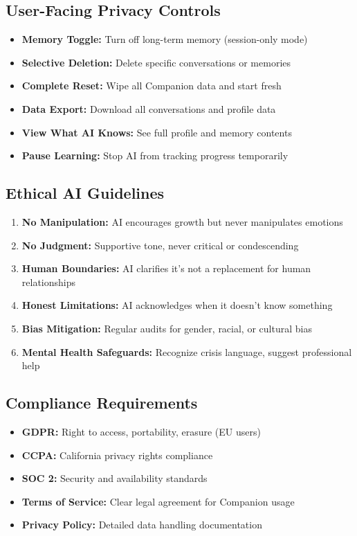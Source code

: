 \documentclass[12pt,a4paper]{article}
\begin{document}
\subsection{User-Facing Privacy Controls}

\begin{itemize}
    \item \textbf{Memory Toggle:} Turn off long-term memory (session-only mode)
    \item \textbf{Selective Deletion:} Delete specific conversations or memories
    \item \textbf{Complete Reset:} Wipe all Companion data and start fresh
    \item \textbf{Data Export:} Download all conversations and profile data
    \item \textbf{View What AI Knows:} See full profile and memory contents
    \item \textbf{Pause Learning:} Stop AI from tracking progress temporarily
\end{itemize}

\subsection{Ethical AI Guidelines}

\begin{enumerate}[leftmargin=*]
    \item \textbf{No Manipulation:} AI encourages growth but never manipulates emotions
    \item \textbf{No Judgment:} Supportive tone, never critical or condescending
    \item \textbf{Human Boundaries:} AI clarifies it's not a replacement for human relationships
    \item \textbf{Honest Limitations:} AI acknowledges when it doesn't know something
    \item \textbf{Bias Mitigation:} Regular audits for gender, racial, or cultural bias
    \item \textbf{Mental Health Safeguards:} Recognize crisis language, suggest professional help
\end{enumerate}

\subsection{Compliance Requirements}

\begin{itemize}
    \item \textbf{GDPR:} Right to access, portability, erasure (EU users)
    \item \textbf{CCPA:} California privacy rights compliance
    \item \textbf{SOC 2:} Security and availability standards
    \item \textbf{Terms of Service:} Clear legal agreement for Companion usage
    \item \textbf{Privacy Policy:} Detailed data handling documentation
\end{itemize}
\end{document}
